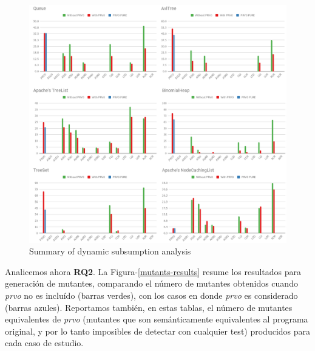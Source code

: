 \begin{figure}[t]
	\begin{center}
		\includegraphics[width=12cm]{figures/Tables.png}
	\end{center}
	\caption{Summary of dynamic subsumption analysis}
	\label{subsumption-results}
\end{figure}

Analicemos ahora \textbf{RQ2}. La Figura-\ref{mutants-results} resume los resultados para generaci\'on de mutantes, comparando el n\'umero de mutantes obtenidos cuando \emph{prvo} no es inclu\'ido (barras verdes), con los casos en donde \emph{prvo} es considerado (barras azules). Reportamos tambi\'en, en estas tablas, el n\'umero de mutantes equivalentes de \emph{prvo} (mutantes que son sem\'anticamente equivalentes al programa original, y por lo tanto imposibles de detectar con cualquier test) producidos para cada caso de estudio.

